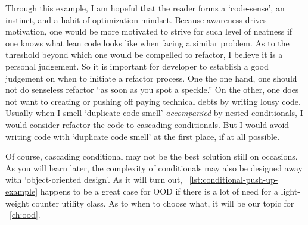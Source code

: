 Through this example, I am hopeful that the reader forms a `code-sense', an instinct, and a habit
of optimization mindset.
Because awareness drives motivation,
one would be more motivated to strive for such level of neatness if one knows
what lean code looks like when facing a similar problem.
As to the threshold beyond which one would be compelled to refactor, I believe it is a
personal judgement.
So it is important for developer to establish a good judgement on when to initiate a refactor
process.
One the one hand, one should not do senseless refactor ``as soon as you spot a speckle.''
On the other, one does not want to creating or pushing off paying technical debts
by writing lousy code.
Usually when I smell `duplicate code smell' \emph{accompanied} by nested conditionals, I would
consider refactor the code to cascading conditionals.
But I would avoid writing code with `duplicate code smell' at the first place, if at all possible.


Of course, cascading conditional may not be the best solution still on occasions.
As you will learn later, the complexity of conditionals may also be designed away with
`object-oriented design'.
As it will turn out, ~\autoref{lst:conditional-push-up-example} happens to be a great
case for OOD if there is a lot of need for a light-weight counter utility class.
As to when to choose what, it will be our topic for ~\autoref{ch:ood}.
